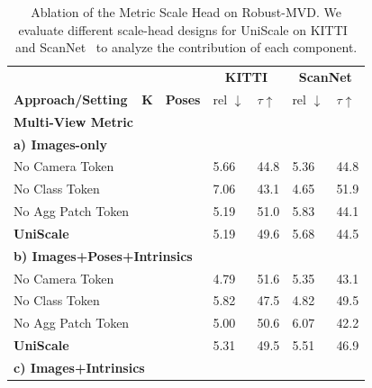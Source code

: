 \documentclass[letterpaper, 10 pt, conference]{ieeeconf}  %
\newcommand{\cmark}{\ding{51}}
\newcommand{\xmark}{\ding{55}}
\begin{document}
\begin{table} [t]
\vspace{2mm}
  \centering
  \scriptsize
  \caption{Ablation of the Metric Scale Head on Robust-MVD. We evaluate different scale-head designs for UniScale on KITTI~\cite{geiger2013vision} and ScanNet~\cite{dai2017scannet} to analyze the contribution of each component.} 
\begin{tabular}{p{2.5cm}p{0.2cm}p{0.3cm}p{0.5cm}p{0.5cm}p{0.5cm}p{0.5cm}}
 \hline
  &  &   & \multicolumn{2}{c}{\textbf{KITTI}} & \multicolumn{2}{c}{\textbf{ScanNet}}\\
\textbf{Approach/Setting}  & \textbf{K} & \textbf{Poses}  & {rel $\downarrow$} & {$\tau\uparrow$} & {rel $\downarrow$} & {$\tau\uparrow$} \\
\hline 

\multicolumn{7}{l}{\textbf{Multi-View Metric}} \\
\hline 
\multicolumn{7}{l}{\textbf{a) Images-only}} \\

No Camera Token & \xmark & \xmark &  5.66 & 44.8 & 5.36 & 44.8 \\
No Class Token  & \xmark & \xmark &  7.06 & 43.1 & 4.65 & 51.9 \\
No Agg Patch Token & \xmark &  \xmark & 5.19 & 51.0 & 5.83 & 44.1 \\
\textbf{UniScale} & \xmark & \xmark  & 5.19 & 49.6 & 5.68 & 44.5 \\
\hline
\multicolumn{7}{l}{\textbf{b) Images+Poses+Intrinsics}} \\

No Camera Token & \cmark & \cmark &  4.79 & 51.6 & 5.35 & 43.1 \\
No Class Token  & \cmark & \cmark &  5.82 & 47.5 & 4.82 & 49.5 \\
No Agg Patch Token & \cmark & \cmark & 5.00 & 50.6 & 6.07 & 42.2 \\
\textbf{UniScale} & \cmark & \cmark & 5.31 & 49.5 & 5.51 &  46.9\\
\hline
\multicolumn{7}{l}{\textbf{c) Images+Intrinsics}} \\


\end{tabular}
\end{table}
\end{document}

